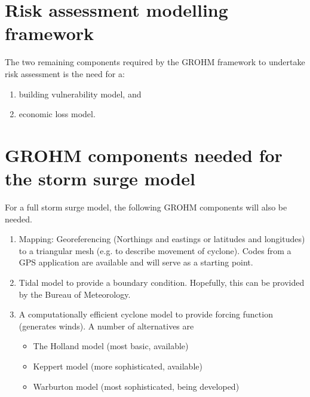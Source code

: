 \documentclass{article}
\newcounter{lastnumber} %
\begin{document}
\section{Risk assessment modelling framework}

The two remaining components required by the GROHM framework to
undertake risk assessment is the need for a:
\begin{enumerate} 
 \setcounter{enumi}{\thelastnumber}
\item building vulnerability model, and
  \label{item:VULN}
\item economic loss model.
  \label{item:ECO}
\setcounter{lastnumber}{\theenumi}  
\end{enumerate} 

\section{GROHM components needed for the storm surge model}

For a full storm surge model, the following GROHM components will
also be needed.

\begin{enumerate}
 \setcounter{enumi}{\thelastnumber}
\item Mapping: Georeferencing (Northings and eastings or latitudes and
  longitudes) to a triangular mesh (e.g. to describe movement of cyclone).
  \label{item:MAP}
  Codes from a GPS application are available and will serve as a
  starting point.
\item Tidal model to provide a boundary condition.
  Hopefully, this can be provided by the Bureau of Meteorology.
  \label{item:TIDAL}
\item A computationally efficient cyclone model to provide forcing function (generates winds).
  A number of alternatives are
  \begin{itemize}
    \item The Holland model (most basic, available)
    \item Keppert model (more sophisticated, available)
    \item Warburton model (most sophisticated, being developed)
  \end{itemize}
  \label{item:CYCLONE}
\setcounter{lastnumber}{\theenumi}
\end{enumerate}
\end{document}
